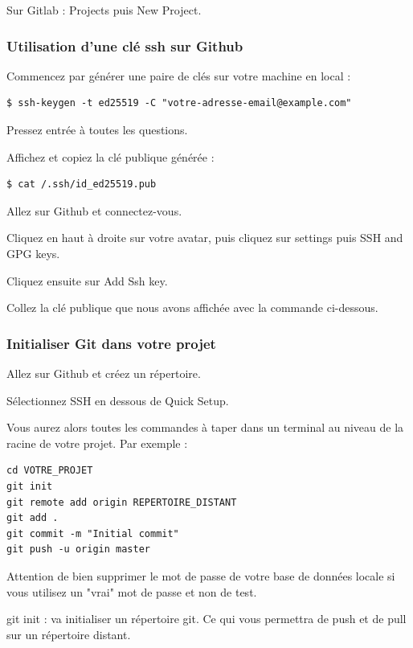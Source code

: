 \documentclass{article}
\begin{document}
Sur Gitlab : Projects puis New Project.

\subsubsection{Utilisation d'une clé ssh sur Github}
Commencez par générer une paire de clés sur votre machine en local :
\begin{verbatim}
$ ssh-keygen -t ed25519 -C "votre-adresse-email@example.com"
\end{verbatim}

Pressez entrée à toutes les questions.

Affichez et copiez la clé publique générée :
\begin{verbatim}
$ cat /.ssh/id_ed25519.pub
\end{verbatim}

Allez sur Github et connectez-vous.

Cliquez en haut à droite sur votre avatar, puis cliquez sur settings puis SSH and GPG keys.

Cliquez ensuite sur Add Ssh key.

Collez la clé publique que nous avons affichée avec la commande ci-dessous.

\subsubsection{Initialiser Git dans votre projet}
Allez sur Github et créez un répertoire.

Sélectionnez SSH en dessous de Quick Setup.

Vous aurez alors toutes les commandes à taper dans un terminal au niveau de la racine de votre projet. Par exemple :
\begin{verbatim}
cd VOTRE_PROJET
git init
git remote add origin REPERTOIRE_DISTANT
git add .
git commit -m "Initial commit"
git push -u origin master
\end{verbatim}

Attention de bien supprimer le mot de passe de votre base de données locale si vous utilisez un "vrai" mot de passe et non de test.

git init : va initialiser un répertoire git. Ce qui vous permettra de push et de pull sur un répertoire distant.
\end{document}
